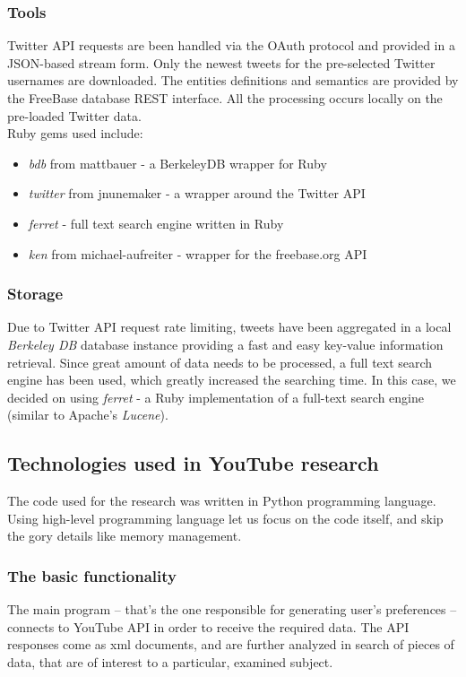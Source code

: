 \documentclass{article}
\begin{document}
\subsubsection{Tools}
Twitter API requests are been handled via the OAuth protocol and provided in a
JSON-based stream form. Only the newest tweets for the pre-selected Twitter
usernames are downloaded. The entities definitions and semantics are provided by
the FreeBase database REST interface. All the processing occurs locally on the
pre-loaded Twitter data. \\ Ruby gems used include: \begin{itemize} \item
\textit{bdb} from mattbauer - a BerkeleyDB wrapper for Ruby
  \item \textit{twitter} from jnunemaker - a wrapper around the Twitter API
  \item \textit{ferret} - full text search engine written in Ruby
  \item \textit{ken} from michael-aufreiter - wrapper for the freebase.org API
\end{itemize}
\subsubsection{Storage}
Due to Twitter API request rate limiting, tweets have been aggregated in a local
\textit{Berkeley DB} database instance providing a fast and easy key-value
information retrieval. Since great amount of data needs to be processed, a full
text search engine has been used, which greatly increased the searching time. In
this case, we decided on using \textit{ferret} - a Ruby implementation of a
full-text search engine (similar to Apache's \textit{Lucene}).

\subsection{Technologies used in YouTube research}
The code used for the research was written in Python programming language. Using
high-level programming language let us focus on the code itself, and skip the
gory details like memory management.

\subsubsection{The basic functionality}
The main program -- that's the one responsible for generating user's preferences
-- connects to YouTube API in order to receive the required data. The
API responses come as xml documents, and are further analyzed in search of
pieces of data, that are of interest to a particular, examined subject.
\end{document}
